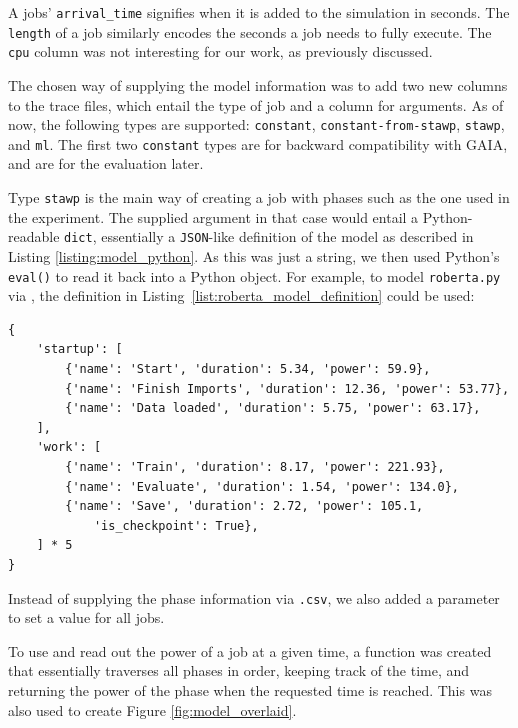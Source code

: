 A jobs' \verb|arrival_time| signifies when it is added to the simulation in seconds. 
The \verb|length| of a job similarly encodes the seconds a job needs to fully execute. The \verb|cpu| column was not interesting for our work, as previously discussed.

The chosen way of supplying the model information was to add two new columns to the trace files, which entail the type of job and a column for arguments. 
As of now, the following types are supported: \verb|constant|, \verb|constant-from-stawp|, \verb|stawp|, and \verb|ml|. 
The first two \verb|constant| types are for backward compatibility with GAIA, and are for the evaluation later.

Type \verb|stawp| is the main way of creating a job with phases such as the one used in the experiment. The supplied argument in that case would entail a Python-readable \verb|dict|, essentially a \verb|JSON|-like definition of the model as described in Listing \ref{listing:model_python}.
As this was just a string, we then used Python's \verb|eval()| to read it back into a Python object.
For example, to model \verb|roberta.py| via \modelname{}, the definition in Listing~\ref{list:roberta_model_definition} could be used:

\begin{minipage}{\linewidth}
\begin{lstlisting}[frame=single, numbers=none, caption={Simplified definition for a job similar to the experiment}, label={list:roberta_model_definition}, basicstyle=\ttfamily]
{
    'startup': [
        {'name': 'Start', 'duration': 5.34, 'power': 59.9},
        {'name': 'Finish Imports', 'duration': 12.36, 'power': 53.77},
        {'name': 'Data loaded', 'duration': 5.75, 'power': 63.17}, 
    ],
    'work': [
        {'name': 'Train', 'duration': 8.17, 'power': 221.93}, 
        {'name': 'Evaluate', 'duration': 1.54, 'power': 134.0}, 
        {'name': 'Save', 'duration': 2.72, 'power': 105.1,
            'is_checkpoint': True}, 
    ] * 5
}
\end{lstlisting}
\end{minipage}

Instead of supplying the phase information via \verb|.csv|, we also added a parameter to set a value for all jobs.

To use \modelname{} and read out the power of a job at a given time, a function was created that essentially traverses all phases in order, keeping track of the time, and returning the power of the phase when the requested time is reached. 
This was also used to create Figure \ref{fig:model_overlaid}.

